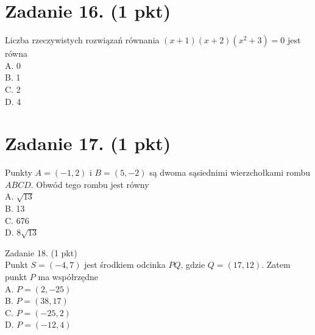 \documentclass[10pt]{article}
\begin{document}
\section*{Zadanie 16. (1 pkt)}
Liczba rzeczywistych rozwiązań równania \((x+1)(x+2)\left(x^{2}+3\right)=0\) jest równa\\
A. 0\\
B. 1\\
C. 2\\
D. 4

\section*{Zadanie 17. (1 pkt)}
Punkty \(A=(-1,2)\) i \(B=(5,-2)\) są dwoma sąsiednimi wierzchołkami rombu \(A B C D\). Obwód tego rombu jest równy\\
A. \(\sqrt{13}\)\\
B. 13\\
C. 676\\
D. \(8 \sqrt{13}\)

Zadanie 18. (1 pkt)\\
Punkt \(S=(-4,7)\) jest środkiem odcinka \(P Q\), gdzie \(Q=(17,12)\). Zatem punkt \(P\) ma współrzędne\\
A. \(P=(2,-25)\)\\
B. \(P=(38,17)\)\\
C. \(P=(-25,2)\)\\
D. \(P=(-12,4)\)
\end{document}
